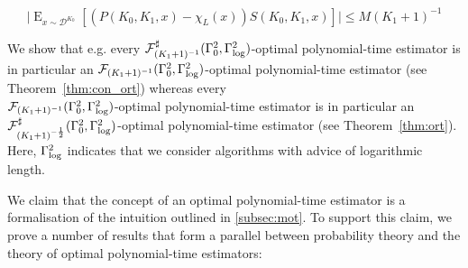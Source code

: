 \documentclass{article}
\numberwithin{equation}{section}
\theoremstyle{definition}
\theoremstyle{plain}
\DeclareMathOperator{\E}{E}
\newcommand{\Abs}[1]{\lvert #1 \rvert}
\newcommand{\Dist}{\mathcal{D}}
\newcommand{\Fall}{\mathcal{F}}
\newcommand{\GammaLog}{\Gamma_{\textnormal{log}}}
\begin{document}
\[\Abs{\E_{x \sim \Dist^{K_0}}[(P(K_0,K_1,x)-\chi_L(x))S(K_0,K_1,x)]} \leq M (K_1+1)^{-1}\]

We show that e.g. every ${\Fall_{(K_1+1)^{-1}}^\sharp(\Gamma_0^2,\GammaLog^2)}$-optimal polynomial-time estimator is in particular an ${\Fall_{(K_1+1)^{-1}}(\Gamma_0^2,\GammaLog^2)}$-optimal polynomial-time estimator (see Theorem~\ref{thm:con_ort}) whereas every\\ ${\Fall_{(K_1+1)^{-1}}(\Gamma_0^2,\GammaLog^2)}$-optimal polynomial-time estimator is in particular an ${\Fall_{(K_1+1)^{-\frac{1}{2}}}^\sharp(\Gamma_0^2,\GammaLog^2)}$-optimal polynomial-time estimator (see Theorem~\ref{thm:ort}). Here, ${\GammaLog^2}$ indicates that we consider algorithms with advice of logarithmic length.

We claim that the concept of an optimal polynomial-time estimator is a formalisation of the intuition outlined in \ref{subsec:mot}. To support this claim, we prove a number of results that form a parallel between probability theory and the theory of optimal polynomial-time estimators:
\end{document}
